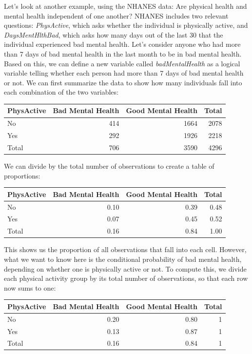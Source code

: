 \documentclass[12pt,]{book}
\theoremstyle{definition}
\theoremstyle{definition}
\theoremstyle{definition}
\theoremstyle{remark}
\begin{document}
Let's look at another example, using the NHANES data: Are physical health and mental health independent of one another? NHANES includes two relevant questions: \emph{PhysActive}, which asks whether the individual is physically active, and \emph{DaysMentHlthBad}, which asks how many days out of the last 30 that the individual experienced bad mental health. Let's consider anyone who had more than 7 days of bad mental health in the last month to be in bad mental health. Based on this, we can define a new variable called \emph{badMentalHealth} as a logical variable telling whether each person had more than 7 days of bad mental health or not. We can first summarize the data to show how many individuals fall into each combination of the two variables:

\begin{tabular}{l|r|r|r}
\hline
PhysActive & Bad Mental Health & Good Mental Health & Total\\
\hline
No & 414 & 1664 & 2078\\
\hline
Yes & 292 & 1926 & 2218\\
\hline
Total & 706 & 3590 & 4296\\
\hline
\end{tabular}

We can divide by the total number of observations to create a table of proportions:

\begin{tabular}{l|r|r|r}
\hline
PhysActive & Bad Mental Health & Good Mental Health & Total\\
\hline
No & 0.10 & 0.39 & 0.48\\
\hline
Yes & 0.07 & 0.45 & 0.52\\
\hline
Total & 0.16 & 0.84 & 1.00\\
\hline
\end{tabular}

This shows us the proportion of all observations that fall into each cell. However, what we want to know here is the conditional probability of bad mental health, depending on whether one is physically active or not. To compute this, we divide each physical activity group by its total number of observations, so that each row now sums to one:

\begin{tabular}{l|r|r|r}
\hline
PhysActive & Bad Mental Health & Good Mental Health & Total\\
\hline
No & 0.20 & 0.80 & 1\\
\hline
Yes & 0.13 & 0.87 & 1\\
\hline
Total & 0.16 & 0.84 & 1\\
\hline
\end{tabular}
\end{document}
